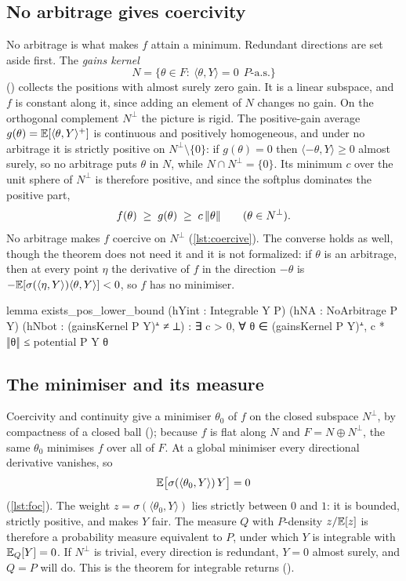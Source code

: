 \documentclass[11pt]{article}
\begin{document}
\subsection{No arbitrage gives coercivity}
No arbitrage is what makes $f$ attain a minimum. Redundant directions are set aside first. The \emph{gains kernel}
\[
  N=\{\theta\in F:\ \langle\theta,Y\rangle=0\ \ P\text{-a.s.}\}
\]
() collects the positions with almost surely zero gain. It is a linear subspace,
and $f$ is constant along it, since adding an element of $N$ changes no gain. On the orthogonal complement $N^\perp$ the picture is
rigid. The positive-gain average $g(\theta)=\mathbb{E}[\langle\theta,Y\rangle^+]$ is continuous and positively
homogeneous, and under no arbitrage it is strictly positive on $N^\perp\setminus\{0\}$: if $g(\theta)=0$
then $\langle-\theta,Y\rangle\ge0$ almost surely, so no arbitrage puts $\theta$ in $N$, while
$N\cap N^\perp=\{0\}$. Its minimum $c$ over the unit sphere of $N^\perp$ is therefore positive, and since
the softplus dominates the positive part,
\[
  f(\theta)\;\ge\;g(\theta)\;\ge\;c\,\lVert \theta\rVert\qquad(\theta\in N^\perp).
\]
No arbitrage makes $f$ coercive on $N^\perp$ (\cref{lst:coercive}). The converse holds as well,
though the theorem does not need it and it is not formalized: if $\theta$ is an arbitrage, then at every
point $\eta$ the derivative of $f$ in the direction $-\theta$ is
$-\mathbb{E}[\sigma(\langle\eta,Y\rangle)\langle\theta,Y\rangle]<0$, so $f$ has no minimiser.

\begin{leancode}[caption={Coercivity from no arbitrage (\texttt{Foundations/FTAPOnePeriodVector}).},label=lst:coercive]
lemma exists_pos_lower_bound (hYint : Integrable Y P) (hNA : NoArbitrage P Y)
    (hNbot : (gainsKernel P Y)ᗮ ≠ ⊥) :
    ∃ c > 0, ∀ θ ∈ (gainsKernel P Y)ᗮ, c * ‖θ‖ ≤ potential P Y θ
\end{leancode}

\subsection{The minimiser and its measure}
Coercivity and continuity give a minimiser $\theta_0$ of $f$ on the closed subspace $N^\perp$, by
compactness of a closed ball (); because
$f$ is flat along $N$ and $F=N\oplus N^\perp$, the same $\theta_0$ minimises $f$ over all of $F$. At a
global minimiser every directional derivative vanishes, so
\[
  \mathbb{E}\bigl[\sigma(\langle\theta_0,Y\rangle)\,Y\bigr]=0
\]
(\cref{lst:foc}). The weight $z=\sigma(\langle\theta_0,Y\rangle)$ lies strictly between $0$ and $1$: it is
bounded, strictly positive, and makes $Y$ fair. The measure $Q$ with $P$-density $z/\mathbb{E}[z]$ is therefore a
probability measure equivalent to $P$, under which $Y$ is integrable with $\mathbb{E}_Q[Y]=0$. If $N^\perp$ is
trivial, every direction is redundant, $Y=0$ almost surely, and $Q=P$ will do. This is the theorem for integrable
returns ().
\end{document}

